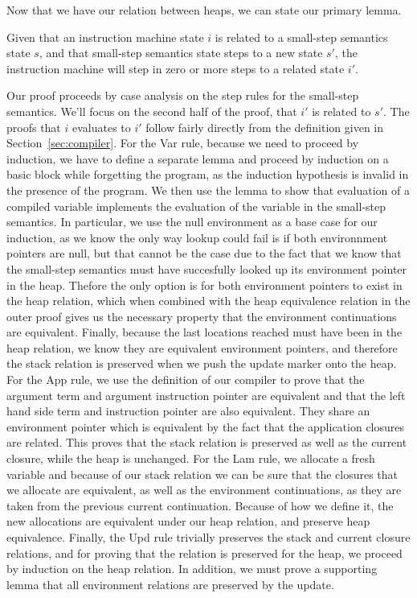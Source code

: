 Now that we have our relation between heaps, we can state our primary lemma.
\begin{lemma} \label{lem:cesm_im}
Given that an instruction machine state $i$ is related to a small-step
semantics state $s$, and that small-step semantics state steps to a new state
$s'$, the instruction machine will step in zero or more steps to a related state
$i'$.
\end{lemma}
\begin{proofoutline}
Our proof proceeds by case analysis on the step rules for the small-step
semantics. We'll focus on the second half of the proof, that $i'$ is related to
$s'$. The proofs that $i$ evaluates to $i'$ follow fairly directly from the
definition given in Section~\ref{sec:compiler}. For the Var rule, because we need to
proceed by induction, we have to define a separate lemma and proceed by
induction on a basic block while forgetting the program, as the induction
hypothesis is invalid in the presence of the program. We then use the lemma to
show that evaluation of a compiled variable implements the evaluation of the
variable in the small-step semantics. In particular, we use the null environment
as a base case for our induction, as we know the only way lookup could fail is
if both environnment pointers are null, but that cannot be the case due to the
fact that we know that the small-step semantics must have succesfully looked
up its environment pointer in the heap. Thefore the only option is for both
environment pointers to exist in the heap relation, which when combined with
the heap equivalence relation in the outer proof gives us the necessary
property that the environment continuations are equivalent. Finally, because
the last locations reached must have been in the heap relation, we know they
are equivalent environment pointers, and therefore the stack relation is
preserved when we push the update marker onto the heap. For the App rule, we
use the definition of our compiler to prove that the argument term and
argument instruction pointer are equivalent and that the left hand side term
and instruction pointer are also equivalent. They share an environment pointer
which is equivalent by the fact that the application closures are related.
This proves that the stack relation is preserved as well as the current
closure, while the heap is unchanged. For the Lam rule, we allocate a fresh
variable and because of our stack relation we can be sure that the closures
that we allocate are equivalent, as well as the environment continuations, as
they are taken from the previous current continuation. Because of how we
define it, the new allocations are equivalent under our heap relation, and
preserve heap equivalence. Finally, the Upd rule trivially preserves the stack
and current closure relations, and for proving that the relation is preserved
for the heap, we proceed by induction on the heap relation. In addition, we
  must prove a supporting lemma that all environment relations are preserved
  by the update. 
\end{proofoutline}

